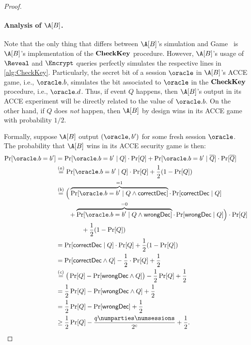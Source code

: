\begin{proof}
\begin{itemize}
	

	
\end{itemize}





\paragraph{Analysis of \texorpdfstring{$\A[B]$}{B}.}
Note that the only thing that differs between $\A[B]$'s simulation and Game~\game{} 
is $\A[B]$'s implementation  of the $\mathbf{CheckKey}$ procedure.
However,
$\A[B]$'s usage of $\Reveal$ and $\Encrypt$ queries perfectly simulates the respective lines in \cref{alg:CheckKey}.
Particularly,
the secret bit of a session $\oracle$ in $\A[B]$'s ACCE game,
i.e., $\oracle.b$,
simulates the bit associated to $\oracle$ in the $\mathbf{CheckKey}$ procedure,
i.e., $\oracle.d$.
Thus,
if event $Q$ happens,
then $\A[B]$'s output in its ACCE experiment will be directly related to the value of $\oracle.b$.
On the other hand,
if $Q$ does \emph{not} happen,
then $\A[B]$ by design  wins in its ACCE game with probability $1 / 2$. 

Formally,
suppose $\A[B]$ output $(\oracle, b')$ for some fresh session $\oracle$.
The probability that $\A[B]$ wins in its ACCE security game is then:
\begin{align}
		\Pr[\bwins] 
			&=\Pr[\bwins \mid Q] \cdot \Pr[Q] 
				+ \Pr[\bwins \mid \overline{Q}] \cdot \Pr[\overline{Q}] \label{eq:B_wins:first_equality} \\
		&\overset{(a)}{=}	\Pr[\bwins \mid Q] \cdot \Pr[Q] 
				+ \frac{1}{2}(1 - \Pr[Q])  \\
		&\overset{(b)}{=} \Big( 
				\overbrace{\Pr[\bwins \mid Q \land \correct]}^{=1} \cdot \Pr[\correct \mid Q] \nonumber \\
				&\qquad  + \overbrace{\Pr[\bwins \mid Q \land \wrong]}^{=0} \cdot \Pr[\wrong \mid Q] 			
			\Big) \cdot \Pr[Q] \\
			&\qquad\qquad + \frac{1}{2}(1 - \Pr[Q]) \nonumber \\
		&= \Pr[\correct \mid Q] \cdot \Pr[Q]  + \frac{1}{2} (1 - \Pr[Q]) \\
		&= \Pr[\correct \land Q]  - \frac{1}{2} \cdot \Pr[Q] + \frac{1}{2} \\
		&\overset{(c)}{=} \big( \Pr[Q] - \Pr[\wrong \land Q]  \big) - \frac{1}{2} \Pr[Q] + \frac{1}{2} \\
		&= \frac{1}{2} \Pr[Q] - \Pr[\wrong \land Q]  + \frac{1}{2} \\		
		&= \frac{1}{2} \Pr[Q] - \Pr[\wrong]  + \frac{1}{2} \\		
		&\geq \frac{1}{2} \Pr[Q] 
			- \frac{q \numparties \numsessions}{2^{c}}  
			+ \frac{1}{2}\label{eq:B_wins:final_inequality}  . 		
\end{align}


\end{proof}
